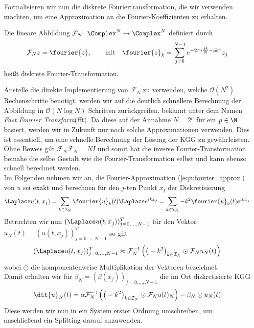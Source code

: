 Formalisieren wir nun die diskrete Fouriertransformation, die wir verwenden möchten, um eine Approximation an die Fourier-Koeffizienten zu erhalten.
\begin{mathdef}
Die lineare Abbildung $\mathcal{F}_N\colon\Complex^N\to\Complex^N$ definiert durch
\[\mathcal{F}_Nz=\fourier{z},\qquad\text{mit}\quad \fourier{z}_k=\sum_{j=0}^{N-1}e^{-2\pi i\frac{jk}{N}-ik\pi}z_j\]
heißt diskrete Fourier-Transformation.
\end{mathdef}
Anstelle die direkte Implementierung von $\mathcal{F}_N$ zu verwenden, welche $\mathcal{O}(N^2)$ Rechenschritte benötigt, werden wir auf die deutlich schnellere Berechnung der Abbildung in $\mathcal{O}(N\log N)$ Schritten zurückgreifen, bekannt unter dem Namen \emph{Fast Fourier Transform}(fft). Da diese auf der Annahme $N=2^p$ für ein $p\in\N$ basiert, werden wir in Zukunft nur noch solche Approximationen verwenden. Dies ist essentiell, um eine schnelle Berechnung der Lösung der KGG zu gewährleisten. Ohne Beweis gilt $\mathcal{F}_N\overline{\mathcal{F}}_N=NI$ und somit hat die inverse Fourier-Transformation beinahe die selbe Gestalt wie die Fourier-Transformation selbst und kann ebenso schnell berechnet werden.\\
Im Folgenden nehmen wir an, die Fourier-Approximation (\ref{eqn:fourier_approx}) von $u$ sei exakt und berechnen für den $j$-ten Punkt $x_j$ der Diskretisierung
\begin{equation}
\label{eqn:laplace_approxu}
\Laplace u(t,x_j)=\sum_{k\in\mathcal{I}_N}\fourier{u}_k(t)\Laplace e^{ikx_j}=\sum_{k\in\mathcal{I}_N}-k^2\fourier{u}_k(t)e^{ikx_j}
\end{equation}
Betrachten wir nun $(\Laplace u(t,x_j))_{j=0,\dots,N-1}^T$ für den Vektor $u_N(t)=(u(t,x_j))_{j=0,\dots,N-1}^T$ so gilt
\[(\Laplace u(t,x_j))_{j=0,\dots,N-1}^T\approx \mathcal{F}_N^{-1}\left(\big(-k^2\big)_{k\in\mathcal{I}_N}\odot\mathcal{F}_Nu_N(t)\right)\]
wobei $\odot$ die komponentenweise Multiplikation der Vektoren bezeichnet.\\
Damit erhalten wir für $\beta_N=(\beta(x_j))_{j=0,\dots,N-1}$ die im Ort diskretisierte KGG
\begin{equation}
\label{eqn:kgg_discretespace}
\dtt{u}_N(t)=\alpha \mathcal{F}_N^{-1}\left(\big(-k^2\big)_{k\in\mathcal{I}_N}\odot\mathcal{F}_Nu(t)_N\right) -\beta_N\odot u_N(t)
\end{equation}
Diese werden wir nun in ein System erster Ordnung umschreiben, um anschließend ein Splitting darauf anzuwenden. 

